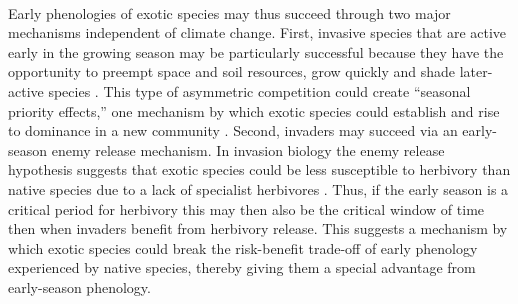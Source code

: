 \documentclass[11pt,a4paper,oneside]{article}
\begin{document}
\\
Early phenologies of exotic species may thus succeed through two major mechanisms independent of climate change. First, invasive species that are active early in the growing season may be particularly successful because they have the opportunity to preempt space and soil resources, grow quickly and shade later-active species \citep{Weiner1990,Wilsey:2011cr,wolkovich:2010fee}. This type of asymmetric competition could create ``seasonal priority effects,'' one mechanism by which exotic species could establish and rise to dominance in a new community \citep{Wainwright:2012tw}. Second, invaders may succeed via an early-season enemy release mechanism. In invasion biology the enemy release hypothesis suggests that exotic species could be less susceptible to herbivory than native species due to a lack of specialist herbivores \citep{Keane:2002uz,Liu:2006kj}. Thus, if the early season is a critical period for herbivory this may then also be the critical window of time then when invaders benefit from herbivory release. This suggests a mechanism by which exotic species could break the risk-benefit trade-off of early phenology experienced by native species, thereby giving them a special advantage from early-season phenology.\\
\\
\end{document}
